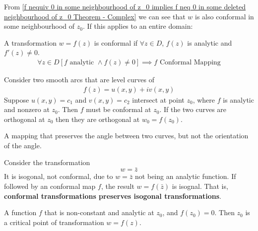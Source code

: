 \documentclass[12pt, english]{book}
\begin{document}
	From \cref{f nequiv 0 in some neighbourhood of z_0 implies f neq 0 in some deleted neighbourhood of z_0 Theorem - Complex} we can see that \(w\) is also conformal in some neighbourhood of \(z_0\). If this applies to an entire domain:
	
	\begin{definition}
		 
		\label{Conformal Mapping Definition - Complex}
		A transformation \(w = f(z)\) is conformal if \(\forall z \in D\), \(f(z)\) is analytic and \(f'(z) \neq 0\).
		\begin{align*}
			\forall z \in D [f \text{ analytic } \land f(z) \neq 0] 
			\implies f \text{ Conformal Mapping}
		\end{align*}
	\end{definition}

	\begin{example}
		Consider two smooth arcs that are level curves of 
		\begin{align*}
			f(z) = u(x,y) + iv(x,y) 
		\end{align*}
		Suppose \(u(x,y) = c_1\) and \(v(x,y) = c_2\) intersect at point \(z_0\), where \(f\) is analytic and nonzero at \(z_0\). Then \(f\) must be conformal at \(z_0\). If the two curves are orthogonal at \(z_0\) then they are orthogonal at \(w_0 = f(z_0)\).
	\end{example}

	\begin{definition}
		\label{Isogonal Mapping Definition - Complex}
		A mapping that preserves the angle between two curves, but not the orientation of the angle.
	\end{definition}
	
	\begin{example}
		Consider the transformation 
		\[w = \bar{z}\]
		It is isogonal, not conformal, due to \(w = \bar{z}\) not being an analytic function. If followed by an conformal map \(f\), the result \(w = f(\bar{z})\) is isognal. That is, \textbf{conformal transformations preserves isogonal transformations}.
	\end{example}
	
	\begin{definition}
		\label{Critical Point Definition - Complex}
		A function \(f\) that is non-constant and analytic at \(z_0\), and \(f(z_0) = 0\). Then \(z_0\) is a critical point of transformation \(w = f(z)\).
	\end{definition}
\end{document}
